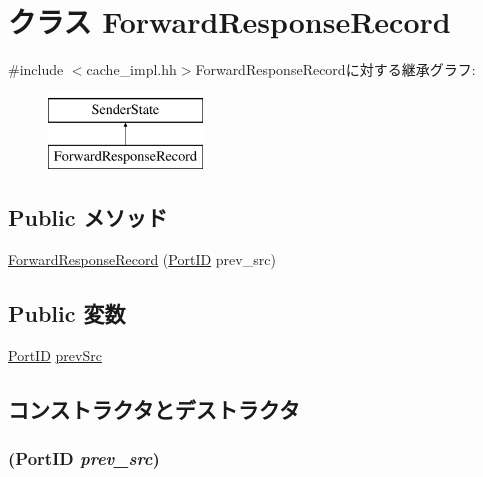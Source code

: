 \hypertarget{classForwardResponseRecord}{
\section{クラス ForwardResponseRecord}
\label{classForwardResponseRecord}
}


{\ttfamily \#include $<$cache\_\-impl.hh$>$}ForwardResponseRecordに対する継承グラフ:\begin{figure}[H]
\begin{center}
\leavevmode
\includegraphics[height=2cm]{classForwardResponseRecord}
\end{center}
\end{figure}
\subsection*{Public メソッド}
\begin{DoxyCompactItemize}
\item 
\hyperlink{classForwardResponseRecord_a782c0ca4056640d9ecf4e7f0006a3905}{ForwardResponseRecord} (\hyperlink{base_2types_8hh_acef4d7d41cb21fdc252e20c04cd7bb8e}{PortID} prev\_\-src)
\end{DoxyCompactItemize}
\subsection*{Public 変数}
\begin{DoxyCompactItemize}
\item 
\hyperlink{base_2types_8hh_acef4d7d41cb21fdc252e20c04cd7bb8e}{PortID} \hyperlink{classForwardResponseRecord_af59c6a6dab3866db905d859decb9a0fe}{prevSrc}
\end{DoxyCompactItemize}


\subsection{コンストラクタとデストラクタ}
\hypertarget{classForwardResponseRecord_a782c0ca4056640d9ecf4e7f0006a3905}{
\subsubsection[{ForwardResponseRecord}]{ ({\bf PortID} {\em prev\_\-src})}}
\label{classForwardResponseRecord_a782c0ca4056640d9ecf4e7f0006a3905}



